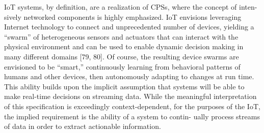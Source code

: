 IoT systems, by definition, are a realization of CPSs, where the concept of
inten- sively networked components is highly emphasized. IoT envisions
leveraging Internet technology to connect and unprecedented number of devices,
yielding a “swarm” of heterogeneous sensors and actuators that can interact with
the physical environment and can be used to enable dynamic decision making in
many different domains [79, 80]. Of course, the resulting device swarms are
envisioned to be “smart,” continuously learning from behavioral patterns of
humans and other devices, then autonomously adapting to changes at run
time. This ability builds upon the implicit assumption that systems will be able
to make real-time decisions on streaming data. While the meaningful
interpretation of this specification is exceedingly context-dependent, for the
purposes of the IoT, the implied requirement is the ability of a system to
contin- ually process streams of data in order to extract actionable
information.

